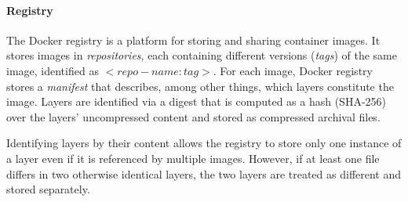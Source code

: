 

\paragraph{Registry}
%
The Docker registry is a platform for storing and sharing container images.
%
It stores images in \emph{repositories}, each containing different versions (\emph{tags}) of
the same image, identified as $<repo-name:tag>$. 
%
For each image, Docker registry stores a \emph{manifest} that describes,
among other things, which layers constitute the image.
%
%
Layers are identified via a digest that is computed as a hash (SHA-256)
over the layers' uncompressed content and stored as compressed archival files.
%
%
%
%
%

%
Identifying layers by their content allows the registry to store only one instance
of a layer even if it is referenced by multiple images.
%
%
However, if at least one file differs in two otherwise identical layers,
the two layers are treated as different and stored separately.
%


